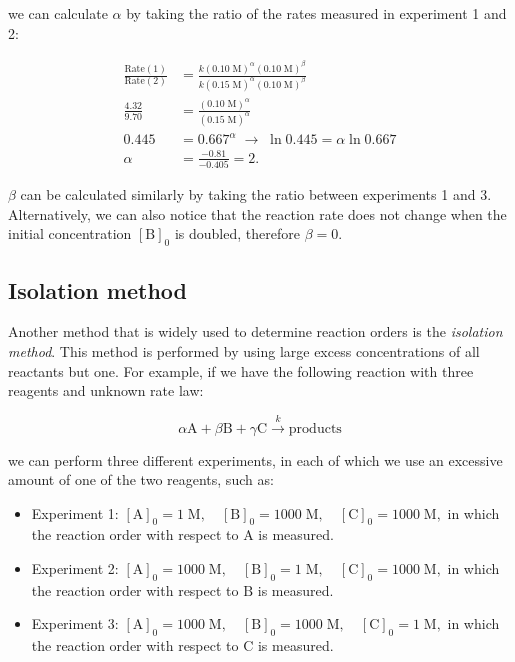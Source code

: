\documentclass[
  9pt,
]{extbook}
\theoremstyle{definition}
\theoremstyle{definition}
\theoremstyle{definition}
\theoremstyle{remark}
\begin{document}
we can calculate \(\alpha\) by taking the ratio of the rates measured in experiment 1 and 2:

\begin{equation}
\begin{aligned}
\frac{\text{Rate}(1)}{\text{Rate}(2)}&=\frac{k(0.10\;\text{M})^\alpha(0.10\;\text{M})^\beta}{k(0.15\;\text{M})^\alpha(0.10\;\text{M})^\beta} \\
\frac{4.32}{9.70}&=\frac{(0.10\;\text{M})^\alpha}{(0.15\;\text{M})^\alpha} \\
0.445&=0.667^\alpha \;\rightarrow\; \ln0.445=\alpha \ln0.667 \\
\alpha &= \frac{-0.81}{-0.405}=2.
\end{aligned}
\label{eq:kiniso1}
\end{equation}

\(\beta\) can be calculated similarly by taking the ratio between experiments 1 and 3. Alternatively, we can also notice that the reaction rate does not change when the initial concentration \([\mathrm{B}]_0\) is doubled, therefore \(\beta=0\).

\hypertarget{isolation-method}{%
\subsection{Isolation method}\label{isolation-method}}

Another method that is widely used to determine reaction orders is the \emph{isolation method}. This method is performed by using large excess concentrations of all reactants but one. For example, if we have the following reaction with three reagents and unknown rate law:

\begin{equation}
\alpha \mathrm{A} + \beta \mathrm{B} + \gamma \mathrm{C} \xrightarrow{k} \text{products}
\end{equation}

we can perform three different experiments, in each of which we use an excessive amount of one of the two reagents, such as:

\begin{itemize}
\item
  Experiment 1: \([\mathrm{A}]_0=1\;\text{M},\quad [\mathrm{B}]_0=1000\;\text{M}, \quad [\mathrm{C}]_0=1000\;\text{M},\) in which the reaction order with respect to \(\mathrm{A}\) is measured.
\item
  Experiment 2: \([\mathrm{A}]_0=1000\;\text{M},\quad [\mathrm{B}]_0=1\;\text{M}, \quad [\mathrm{C}]_0=1000\;\text{M},\) in which the reaction order with respect to \(\mathrm{B}\) is measured.
\item
  Experiment 3: \([\mathrm{A}]_0=1000\;\text{M},\quad [\mathrm{B}]_0=1000\;\text{M}, \quad [\mathrm{C}]_0=1\;\text{M},\) in which the reaction order with respect to \(\mathrm{C}\) is measured.
\end{itemize}
\end{document}
